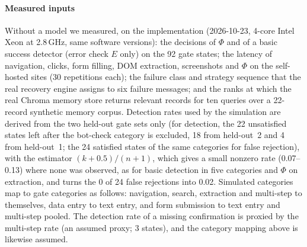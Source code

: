 \paragraph{Measured inputs} Without a model we measured, on the implementation (2026-10-23, 4-core Intel Xeon at 2.8\,GHz, same software versions): the decisions of $\Phi$ and of a basic success detector (error check $E$ only) on the 92 gate states; the latency of navigation, clicks, form filling, DOM extraction, screenshots and $\Phi$ on the self-hosted sites (30 repetitions each); the failure class and strategy sequence that the real recovery engine assigns to six failure messages; and the ranks at which the real Chroma memory store returns relevant records for ten queries over a 22-record synthetic memory corpus. Detection rates used by the simulation are derived from the two held-out gate sets only (for detection, the 22 unsatisfied states left after the bot-check category is excluded, 18 from held-out~2 and 4 from held-out~1; the 24 satisfied states of the same categories for false rejection), with the estimator $(k+0.5)/(n+1)$, which gives a small nonzero rate (0.07--0.13) where none was observed, as for basic detection in five categories and $\Phi$ on extraction, and turns the 0 of 24 false rejections into 0.02. Simulated categories map to gate categories as follows: navigation, search, extraction and multi-step to themselves, data entry to text entry, and form submission to text entry and multi-step pooled. The detection rate of a missing confirmation is proxied by the multi-step rate (an assumed proxy; 3 states), and the category mapping above is likewise assumed.

